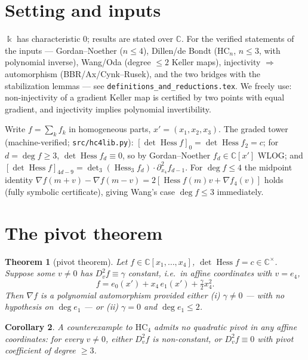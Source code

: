 \documentclass[11pt]{article}
\theoremstyle{plain}
\newtheorem{theorem}{Theorem}[section]
\newtheorem{corollary}[theorem]{Corollary}
\theoremstyle{definition}
\newcommand{\C}{\mathbb{C}}
\newcommand{\kk}{\Bbbk}
\newcommand{\Hess}{\operatorname{Hess}}
\newcommand{\HC}{\mathrm{HC}}
\begin{document}
\section{Setting and inputs}

$\kk$ has characteristic $0$; results are stated over $\C$.
For the verified statements of the inputs --- Gordan--Noether ($n\le4$),
Dillen/de Bondt ($\HC_n$, $n\le3$, with polynomial inverse), Wang/Oda
(degree $\le2$ Keller maps), injectivity $\Rightarrow$ automorphism
(BBR/Ax/Cynk--Rusek), and the two bridges with the stabilization lemmas ---
see \texttt{definitions\_and\_reductions.tex}. We freely use:
non-injectivity of a gradient Keller map is certified by two points with
equal gradient, and injectivity implies polynomial invertibility.

Write $f=\sum_kf_k$ in homogeneous parts, $x'=(x_1,x_2,x_3)$.
The graded tower (machine-verified; \texttt{src/hc4lib.py}):
$[\det\Hess f]_0=\det\Hess f_2=c$;
for $d=\deg f\ge3$, $\det\Hess f_d\equiv0$, so by Gordan--Noether
$f_d\in\C[x']$ WLOG; and
$[\det\Hess f]_{4d-9}=\det_3(\Hess_3f_d)\cdot\partial_{x_4}^2f_{d-1}$.
For $\deg f\le4$ the midpoint identity
$\nabla f(m+v)-\nabla f(m-v)=2[\Hess f(m)v+\nabla f_4(v)]$
holds (fully symbolic certificate), giving Wang's case $\deg f\le3$
immediately.

\section{The pivot theorem}

\begin{theorem}[pivot theorem]\label{thm:pivot}
Let $f\in\C[x_1,\dots,x_4]$, $\det\Hess f=c\in\C^\times$. Suppose some
$v\ne0$ has $D_v^2f\equiv\gamma$ constant, i.e.\ in affine coordinates
with $v=e_4$,
\[
f=e_0(x')+x_4\,e_1(x')+\tfrac\gamma2x_4^2 .
\]
Then $\nabla f$ is a polynomial automorphism provided either
\emph{(i)} $\gamma\ne0$ --- with \emph{no hypothesis on} $\deg e_1$ --- or
\emph{(ii)} $\gamma=0$ and $\deg e_1\le2$.
\end{theorem}

\begin{corollary}\label{cor:nopivot}
A counterexample to $\HC_4$ admits no quadratic pivot in any affine
coordinates: for every $v\ne0$, either $D_v^2f$ is non-constant, or
$D_v^2f\equiv0$ with pivot coefficient of degree $\ge3$.
\end{corollary}
\end{document}
